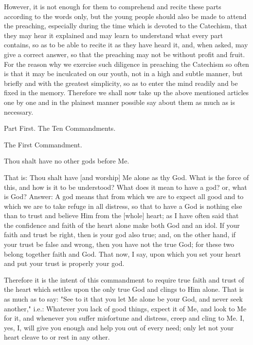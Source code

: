 However, it is not enough for them to comprehend and recite these
parts according to the words only, but the young people should also be
made to attend the preaching, especially during the time which is
devoted to the Catechism, that they may hear it explained and may learn
to understand what every part contains, so as to be able to recite it
as they have heard it, and, when asked, may give a correct answer, so
that the preaching may not be without profit and fruit. For the reason
why we exercise such diligence in preaching the Catechism so often is
that it may be inculcated on our youth, not in a high and subtle
manner, but briefly and with the greatest simplicity, so as to enter
the mind readily and be fixed in the memory. Therefore we shall now
take up the above mentioned articles one by one and in the plainest
manner possible say about them as much as is necessary.



 Part First. The Ten Commandments.


The First Commandment.


Thou shalt have no other gods before Me.


That is: Thou shalt have [and worship] Me alone as thy God. What is the
force of this, and how is it to be understood? What does it mean to
have a god? or, what is God? Answer: A god means that from which we are
to expect all good and to which we are to take refuge in all distress,
so that to have a God is nothing else than to trust and believe Him
from the [whole] heart; as I have often said that the confidence and
faith of the heart alone make both God and an idol. If your faith and
trust be right, then is your god also true; and, on the other hand, if
your trust be false and wrong, then you have not the true God; for
these two belong together faith and God. That now, I say, upon which
you set your heart and put your trust is properly your god.

Therefore it is the intent of this commandment to require true faith
and trust of the heart which settles upon the only true God and clings
to Him alone. That is as much as to say: "See to it that you let Me
alone be your God, and never seek another," i.e.: Whatever you lack of
good things, expect it of Me, and look to Me for it, and whenever you
suffer misfortune and distress, creep and cling to Me. I, yes, I, will
give you enough and help you out of every need; only let not your heart
cleave to or rest in any other.

